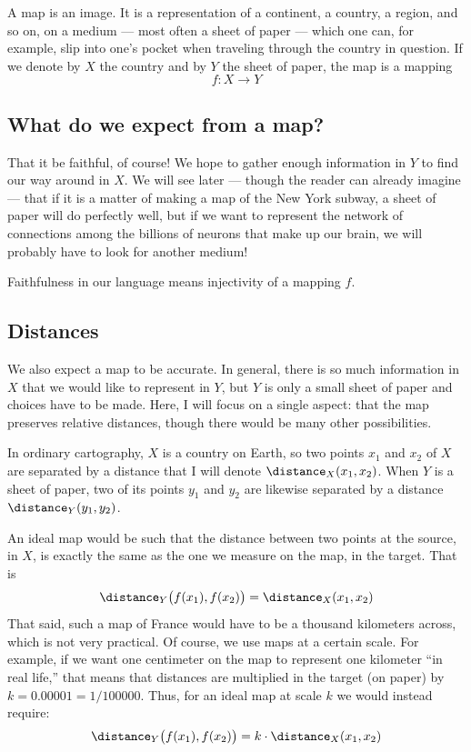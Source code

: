 \documentclass{amsart}
\begin{document}
A map is an image. It is a representation of a continent, a country, a
region, and so on, on a medium --- most often a sheet of paper --- which
one can, for example, slip into one’s pocket when traveling through
the country in question.
If we denote by $X$ the country and by $Y$ the sheet of paper, the map
is a mapping
\[
  f:X\rightarrow Y
\]

\subsection{What do we expect from a map?}
That it be faithful, of course! We hope to gather enough information
in $Y$ to find our way around in $X$. We will see later --- though the
reader can already imagine --- that if it is a matter of making a map of
the New York subway, a sheet of paper will do perfectly well, but if we
want to represent the network of connections among the billions of
neurons that make up our brain, we will probably have to look for
another medium!

Faithfulness in our language means injectivity of a mapping $f$.

\subsection{Distances}

We also expect a map to be accurate. In general, there is so much
information in $X$ that we would like to represent in $Y$, but $Y$ is
only a small sheet of paper and choices have to be made. Here, I will
focus on a single aspect: that the map preserves relative distances,
though there would be many other possibilities.

In ordinary cartography, $X$ is a country on Earth, so two points
$x_1$ and $x_2$ of $X$ are separated by a distance that I will denote
$\distance_{X}(x_{1},x_{2})$.  When $Y$ is a sheet of paper, two
of its points $y_{1}$ and $y_{2}$ are likewise separated by a distance
$\distance_{Y}(y_{1},y_{2})$.

An ideal map would be such that the distance between two points at the
source, in $X$, is exactly the same as the one we measure on the map,
in the target. That is
\[
  \distance_{Y}\big(f(x_{1}),f(x_{2})\big)
  =
  \distance_{X}(x_{1},x_{2})
\]
That said, such a map of France would have to be a thousand kilometers
across, which is not very practical. Of course, we use maps at a
certain scale. For example, if we want one centimeter on the map to
represent one kilometer ``in real life,'' that means that distances are
multiplied in the target (on paper) by $k = 0.00001 = 1/100000$. Thus,
for an ideal map at scale $k$ we would instead require:
\[
  \distance_{Y}\big(f(x_{1}),f(x_{2})\big)
  =
  k\cdot\distance_{X}(x_{1},x_{2})
\]
\end{document}
